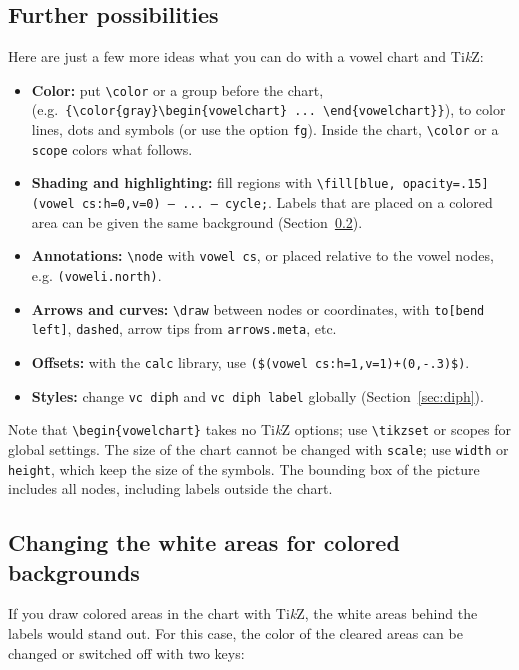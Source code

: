 \documentclass[a4paper,11pt]{article}
\newcommand\cmd[1]{\texttt{\textbackslash #1}}
\newcommand\opt[1]{\texttt{#1}}
\begin{document}
\subsection{Further possibilities}

Here are just a few more ideas what you can do with a vowel chart and Ti\textit{k}Z:

\begin{itemize}
	\item
		\textbf{Color:} put \cmd{color} or a group before the chart,
		(e.g.\ \texttt{\{\cmd{color}\{gray\}\cmd{begin}\{vowelchart\} ... \cmd{end}\{vowelchart\}\}}), to color lines, dots and symbols (or use the option \opt{fg}).
		Inside the chart, \cmd{color} or a \texttt{scope} colors what follows.
	\item
		\textbf{Shading and highlighting:} fill regions with
		\cmd{fill}\texttt{[blue, opacity=.15] (vowel cs:h=0,v=0) -- ... -- cycle;}. Labels that are placed on a colored area can be given the same background (Section~\ref{sec:colorlabels}).
	\item
		\textbf{Annotations:} \cmd{node} with \texttt{vowel cs}, or placed relative
		to the vowel nodes, e.g. \verb|(voweli.north)|.
	\item
		\textbf{Arrows and curves:} \cmd{draw} between nodes or coordinates, with
		\texttt{to[bend left]}, \texttt{dashed}, arrow tips from \texttt{arrows.meta}, etc.
	\item
		\textbf{Offsets:} with the \texttt{calc} library, use
		\verb|($(vowel cs:h=1,v=1)+(0,-.3)$)|.
	\item
		\textbf{Styles:} change \texttt{vc diph} and \texttt{vc diph label}
		globally (Section~\ref{sec:diph}).
\end{itemize}

\noindent
Note that \cmd{begin\{vowelchart\}} takes no Ti\textit{k}Z options; use \cmd{tikzset} or scopes for
global settings. The size of the chart cannot be changed with \texttt{scale};
use \opt{width} or \opt{height}, which keep the size of the symbols.
The bounding box of the picture includes all nodes, including labels outside the
chart.



\subsection{Changing the white areas for colored backgrounds} \label{sec:colorlabels}

If you draw colored areas in the chart with Ti\textit{k}Z, the white areas behind the labels would stand out. For this case, the color of the cleared areas can be changed or switched off with two keys:
\end{document}
